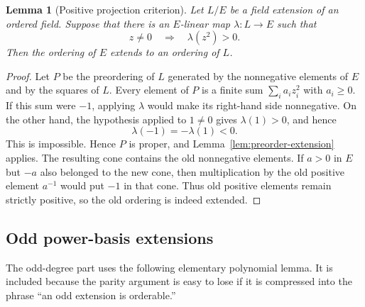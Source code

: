 \documentclass[uplatex,dvipdfmx]{jsarticle}
\newtheorem{lemma}[theorem]{Lemma}
\theoremstyle{definition}
\theoremstyle{remark}
\begin{document}
\begin{lemma}[Positive projection criterion]\label{lem:projection}
Let $L/E$ be a field extension of an ordered field.  Suppose that there is an
$E$-linear map $\lambda:L\to E$ such that
\[
  z\ne0\quad\Longrightarrow\quad \lambda(z^2)>0.
\]
Then the ordering of $E$ extends to an ordering of $L$.
\end{lemma}
\begin{proof}
Let $P$ be the preordering of $L$ generated by the nonnegative elements of
$E$ and by the squares of $L$.  Every element of $P$ is a finite sum
$\sum_i a_i z_i^2$ with $a_i\ge0$.  If this sum were $-1$, applying
$\lambda$ would make its right-hand side nonnegative.  On the other hand,
the hypothesis applied to $1\ne0$ gives $\lambda(1)>0$, and hence
\[
  \lambda(-1)=-\lambda(1)<0.
\]
This is impossible.  Hence $P$ is proper, and
Lemma~\ref{lem:preorder-extension} applies.  The resulting cone contains the
old nonnegative elements.  If $a>0$ in $E$ but $-a$ also belonged to the new
cone, then multiplication by the old positive element $a^{-1}$ would put
$-1$ in that cone.  Thus old positive elements remain strictly positive, so
the old ordering is indeed extended.
\end{proof}

\subsection{Odd power-basis extensions}

The odd-degree part uses the following elementary polynomial lemma.  It is
included because the parity argument is easy to lose if it is compressed into
the phrase ``an odd extension is orderable.''
\end{document}
